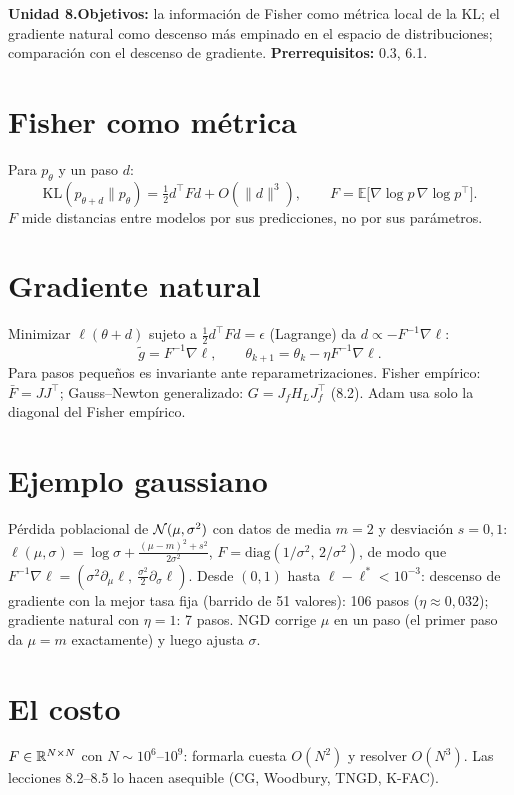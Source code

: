 \documentclass[11pt,a4paper]{article}
\begin{document}

\noindent\textbf{Unidad 8.}\quad\textbf{Objetivos:} la información de Fisher como métrica local de la KL; el gradiente natural como descenso más empinado en
el espacio de distribuciones; comparación con el descenso de gradiente.
\textbf{Prerrequisitos:} 0.3, 6.1.

\section{Fisher como métrica}
Para $p_\theta$ y un paso $d$:
\[\mathrm{KL}(p_{\theta+d}\|p_\theta)=\tfrac12d^\top Fd+O(\|d\|^3),\qquad F=\mathbb E\big[\nabla\log p\,\nabla\log p^\top\big].\]
$F$ mide distancias entre modelos por sus predicciones, no por sus parámetros.

\section{Gradiente natural}
Minimizar $\ell(\theta+d)$ sujeto a $\frac12d^\top Fd=\epsilon$ (Lagrange) da $d\propto-F^{-1}\nabla\ell$:
\[\tilde g=F^{-1}\nabla\ell,\qquad\theta_{k+1}=\theta_k-\eta F^{-1}\nabla\ell.\]
Para pasos pequeños es invariante ante reparametrizaciones. Fisher empírico: $\bar F=JJ^\top$; Gauss--Newton generalizado: $G=J_fH_LJ_f^\top$ (8.2). Adam usa
solo la diagonal del Fisher empírico.

\section{Ejemplo gaussiano \evS}
Pérdida poblacional de $\mathcal{N}(\mu,\sigma^2)$ con datos de media $m=2$ y desviación $s=0{,}1$:
$\ell(\mu,\sigma)=\log\sigma+\frac{(\mu-m)^2+s^2}{2\sigma^2}$, $F=\mathrm{diag}(1/\sigma^2,\,2/\sigma^2)$, de modo que
$F^{-1}\nabla\ell=(\sigma^2\partial_\mu\ell,\ \tfrac{\sigma^2}2\partial_\sigma\ell)$. Desde $(0,1)$ hasta $\ell-\ell^\ast<10^{-3}$: descenso de gradiente con la mejor tasa
fija (barrido de 51 valores): 106 pasos ($\eta\approx0{,}032$); gradiente natural con $\eta=1$: 7 pasos. NGD corrige $\mu$ en un paso (el primer paso da $\mu=m$
exactamente) y luego ajusta $\sigma$.

\section{El costo}
$F\in\mathbb{R}^{N\times N}$ con $N\sim10^6$--$10^9$: formarla cuesta $O(N^2)$ y resolver $O(N^3)$. Las lecciones 8.2--8.5 lo hacen asequible (CG, Woodbury, TNGD, K-FAC).
\end{document}
